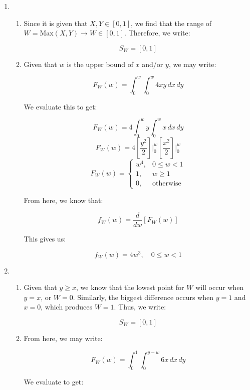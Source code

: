 \begin{enumerate}

  \item

    \begin{enumerate}

      \item Since it is given that $X,Y\in[0,1]$, we find that the range of $W=\text{Max}(X,Y)\to \boxed{W\in[0,1]}$. Therefore, we write:

        $$\boxed{S_W=[0,1]}$$

      \item Given that $w$ is the upper bound of $x$ and/or $y$, we may write:

        $$F_W(w)=\int_0^w\int_0^w 4xy\,dx\,dy$$

        We evaluate this to get:

        $$F_W(w)=4\int_0^wy\int_0^w x\,dx\,dy$$
        $$F_W(w)=4\left[\frac{y^2}{2}\right]\Big|_0^w\left[ \frac{x^2}{2} \right]\Big|_0^w$$
        $$\boxed{F_W(w)=\left\{ \begin{array}{ll} w^4, & 0\leq w<1\\ 1, & w\geq 1\\ 0, & \text{otherwise}\end{array}}$$

        From here, we know that:

        $$f_W(w)=\frac{d}{dw}[F_W(w)]$$

        This gives us:

        $$\boxed{f_W(w)=4w^3,\quad 0\leq w<1}$$

    \end{enumerate}

  \item

    \begin{enumerate}

      \item Given that $y\geq x$, we know that the lowest point for $W$ will occur when $y=x$, or $W=0$. Similarly, the biggest difference occurs when $y=1$ and $x=0$, which produces $W=1$. Thus, we write:

        $$\boxed{S_W=[0,1]}$$

      \item From here, we may write:

        $$F_W(w)=\int_0^1\int_0^{y-w} 6x\,dx\,dy$$

        We evaluate to get:


\end{enumerate}
\end{enumerate}
